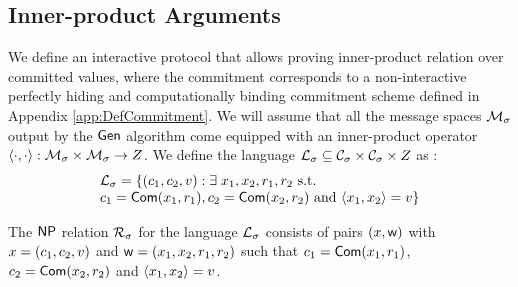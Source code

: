 \subsection{Inner-product Arguments}
We define an interactive protocol that allows proving inner-product relation over committed values, where the commitment corresponds to a non-interactive perfectly hiding and computationally binding commitment scheme defined in Appendix \ref{app:DefCommitment}. %
We will assume that all the message spaces $\mathcal{M}_\sigma$ output by the $\mathsf{Gen}$ algorithm come equipped with an inner-product operator $\langle \cdot,\cdot\rangle:\mathcal{M}_\sigma\times \mathcal{M}_\sigma\rightarrow Z$. We define the language $\mathcal{L}_\sigma\subseteq \mathcal{C}_\sigma\times \mathcal{C}_\sigma\times Z$ as :
\begin{equation*}
\begin{array}{l}
\mathcal{L}_\sigma = \{(c_1,c_2,v):\exists \; x_1,x_2,r_1,r_2 \text{ s.t. } \\
c_1=\mathsf{Com}(x_1,r_1), c_2=\mathsf{Com}(x_2,r_2) \text{ and } \langle x_1,x_2\rangle=v\} 
\end{array}
\end{equation*}

The $\mathsf{NP}$ relation $\mathcal{R}_\sigma$ for the language $\mathcal{L}_\sigma$ consists of pairs $({x},\mathsf{w})$ with ${x}=(c_1,c_2,v)$ and $\mathsf{w}=(x_1,x_2,r_1,r_2)$ such that $c_1=\mathsf{Com}(x_1,r_1)$, $c_2=\mathsf{Com}(x_2,r_2)$ and $\langle x_1,x_2\rangle=v$.


